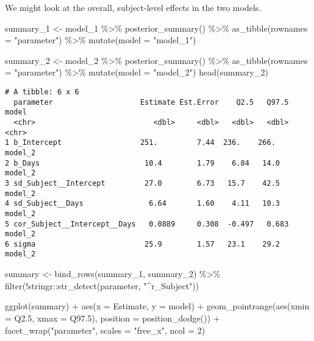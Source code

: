 \documentclass[
  letterpaper,
  DIV=11,
  numbers=noendperiod]{scrreprt}
\newenvironment{Shaded}{\begin{snugshade}}{\end{snugshade}}
\newcommand{\AttributeTok}[1]{\textcolor[rgb]{0.40,0.45,0.13}{#1}}
\newcommand{\DecValTok}[1]{\textcolor[rgb]{0.68,0.00,0.00}{#1}}
\newcommand{\FloatTok}[1]{\textcolor[rgb]{0.68,0.00,0.00}{#1}}
\newcommand{\FunctionTok}[1]{\textcolor[rgb]{0.28,0.35,0.67}{#1}}
\newcommand{\NormalTok}[1]{\textcolor[rgb]{0.00,0.23,0.31}{#1}}
\newcommand{\OtherTok}[1]{\textcolor[rgb]{0.00,0.23,0.31}{#1}}
\newcommand{\SpecialCharTok}[1]{\textcolor[rgb]{0.37,0.37,0.37}{#1}}
\newcommand{\StringTok}[1]{\textcolor[rgb]{0.13,0.47,0.30}{#1}}
\begin{document}
We might look at the overall, subject-level effects in the two models.

\begin{Shaded}
\begin{Highlighting}[]
\NormalTok{summary\_1 }\OtherTok{\textless{}{-}}\NormalTok{ model\_1 }\SpecialCharTok{\%\textgreater{}\%} 
  \FunctionTok{posterior\_summary}\NormalTok{() }\SpecialCharTok{\%\textgreater{}\%} 
  \FunctionTok{as\_tibble}\NormalTok{(}\AttributeTok{rownames =} \StringTok{"parameter"}\NormalTok{) }\SpecialCharTok{\%\textgreater{}\%} 
  \FunctionTok{mutate}\NormalTok{(}\AttributeTok{model =} \StringTok{"model\_1"}\NormalTok{)}

\NormalTok{summary\_2 }\OtherTok{\textless{}{-}}\NormalTok{ model\_2 }\SpecialCharTok{\%\textgreater{}\%} 
  \FunctionTok{posterior\_summary}\NormalTok{() }\SpecialCharTok{\%\textgreater{}\%} 
  \FunctionTok{as\_tibble}\NormalTok{(}\AttributeTok{rownames =} \StringTok{"parameter"}\NormalTok{) }\SpecialCharTok{\%\textgreater{}\%} 
  \FunctionTok{mutate}\NormalTok{(}\AttributeTok{model =} \StringTok{"model\_2"}\NormalTok{)}
\FunctionTok{head}\NormalTok{(summary\_2)}
\end{Highlighting}
\end{Shaded}

\begin{verbatim}
# A tibble: 6 x 6
  parameter                    Estimate Est.Error    Q2.5   Q97.5 model  
  <chr>                           <dbl>     <dbl>   <dbl>   <dbl> <chr>  
1 b_Intercept                  251.         7.44  236.    266.    model_2
2 b_Days                        10.4        1.79    6.84   14.0   model_2
3 sd_Subject__Intercept         27.0        6.73   15.7    42.5   model_2
4 sd_Subject__Days               6.64       1.60    4.11   10.3   model_2
5 cor_Subject__Intercept__Days   0.0889     0.308  -0.497   0.683 model_2
6 sigma                         25.9        1.57   23.1    29.2   model_2
\end{verbatim}

\begin{Shaded}
\begin{Highlighting}[]
\NormalTok{summary }\OtherTok{\textless{}{-}} \FunctionTok{bind\_rows}\NormalTok{(summary\_1, summary\_2) }\SpecialCharTok{\%\textgreater{}\%} 
  \FunctionTok{filter}\NormalTok{(}\SpecialCharTok{!}\NormalTok{stringr}\SpecialCharTok{::}\FunctionTok{str\_detect}\NormalTok{(parameter, }\StringTok{"\^{}r\_Subject"}\NormalTok{)) }

\FunctionTok{ggplot}\NormalTok{(summary) }\SpecialCharTok{+} 
  \FunctionTok{aes}\NormalTok{(}\AttributeTok{x =}\NormalTok{ Estimate, }\AttributeTok{y =}\NormalTok{ model) }\SpecialCharTok{+} 
  \FunctionTok{geom\_pointrange}\NormalTok{(}\FunctionTok{aes}\NormalTok{(}\AttributeTok{xmin =}\NormalTok{ Q2}\FloatTok{.5}\NormalTok{, }\AttributeTok{xmax =}\NormalTok{ Q97}\FloatTok{.5}\NormalTok{), }\AttributeTok{position =} \FunctionTok{position\_dodge}\NormalTok{()) }\SpecialCharTok{+} 
  \FunctionTok{facet\_wrap}\NormalTok{(}\StringTok{"parameter"}\NormalTok{, }\AttributeTok{scales =} \StringTok{"free\_x"}\NormalTok{, }\AttributeTok{ncol =} \DecValTok{2}\NormalTok{)}
\end{Highlighting}
\end{Shaded}
\end{document}

